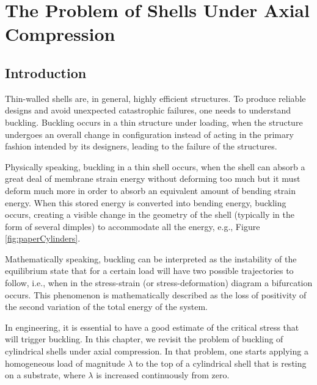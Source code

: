 \chapter{The Problem of Shells Under Axial Compression}

\section{Introduction}
\label{sec:1}
Thin-walled shells are, in general, highly efficient structures. To produce reliable designs and avoid unexpected catastrophic failures, one needs to understand buckling. Buckling occurs in a thin structure under loading, when the structure undergoes an overall change in configuration instead of acting in the primary fashion intended by its designers, leading to the failure of the structures. 

Physically speaking, buckling in a thin shell occurs, when the shell can absorb a great deal of membrane strain energy without deforming too much but it must deform much more in order to absorb an equivalent amount of bending strain energy. When this stored energy is converted into bending energy, buckling occurs, creating a visible change in the geometry of the shell (typically in the form of several dimples) to accommodate all the energy, e.g., Figure \ref{fig:paperCylinders}. 

Mathematically speaking, buckling can be interpreted as the instability of the equilibrium state that for a certain load will have two possible trajectories to follow, i.e., when in the stress-strain (or stress-deformation) diagram a bifurcation occurs. This phenomenon is mathematically described as the loss of positivity of the second variation of the total energy of the system. 

In engineering, it is essential to have a good estimate of the critical stress that will trigger buckling. In this chapter, we revisit the problem of buckling of cylindrical shells under axial compression. In that problem, one starts applying a homogeneous load of magnitude $\lambda$ to the top of a cylindrical shell that is resting on a substrate, where $\lambda$ is increased continuously from zero. 

